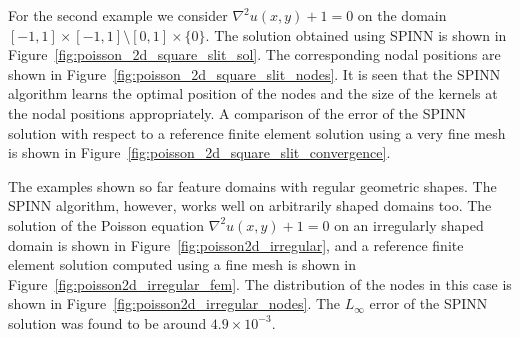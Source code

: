\documentclass[12pt]{article}
\begin{document}
For the second example we consider $\nabla^2 u(x, y) + 1 = 0$ on the domain $[-1,1]\times[-1,1] \setminus [0,1]\times\{0\}$. The solution obtained using SPINN is shown in Figure~\ref{fig:poisson_2d_square_slit_sol}. The corresponding nodal positions are shown in Figure~\ref{fig:poisson_2d_square_slit_nodes}. It is seen that the SPINN algorithm learns the optimal position of the nodes and the size of the kernels at the nodal positions appropriately. A comparison of the error of the SPINN solution with respect to a reference finite element solution using a very fine mesh is shown in Figure~\ref{fig:poisson_2d_square_slit_convergence}. 

The examples shown so far feature domains with regular geometric shapes. The SPINN algorithm, however, works well on arbitrarily shaped domains too. The solution of the Poisson equation $\nabla^2 u(x,y) + 1 = 0$ on an irregularly shaped domain is shown in Figure~\ref{fig:poisson2d_irregular}, and a reference finite element solution computed using a fine mesh is shown in Figure~\ref{fig:poisson2d_irregular_fem}. The distribution of the nodes in this case is shown in Figure~\ref{fig:poisson2d_irregular_nodes}.  The $L_{\infty}$ error of the SPINN solution was found to be around $4.9\times 10^{-3}$. 
\end{document}
